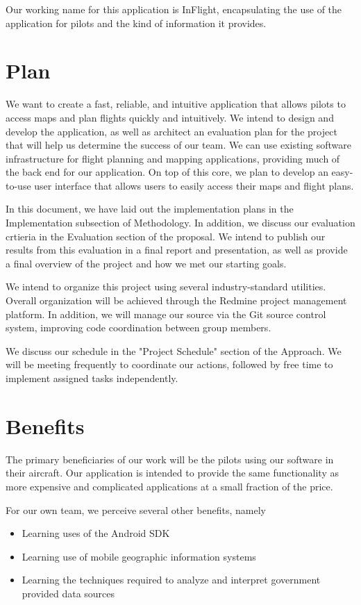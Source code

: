 \documentclass[10pt,a4paper]{report}
\begin{document}
Our working name for this application is InFlight, encapsulating the use of the application for pilots and the kind of information it provides.
\section{Plan}
We want to create a fast, reliable, and intuitive application that allows pilots to access maps and plan flights quickly and intuitively. We intend to design and develop the application, as well as architect an evaluation plan for the project that will help us determine the success of our team. We can use existing software infrastructure for flight planning and mapping applications, providing much of the back end for our application. On top of this core, we plan to develop an easy-to-use user interface that allows users to easily access their maps and flight plans. 

In this document, we have laid out the implementation plans in the Implementation subsection of Methodology. In addition, we discuss our evaluation crtieria in the Evaluation section of the proposal. We intend to publish our results from this evaluation in a final report and presentation, as well as provide a final overview of the project and how we met our starting goals.

We intend to organize this project using several industry-standard utilities. Overall organization will be achieved through the Redmine project management platform. In addition, we will manage our source via the Git source control system, improving code coordination between group members. 

We discuss our schedule in the "Project Schedule" section of the Approach. We will be meeting frequently to coordinate our actions, followed by free time to implement assigned tasks independently.
\section{Benefits}
The primary beneficiaries of our work will be the pilots using our software in their aircraft. Our application is intended to provide the same functionality as more expensive and complicated applications at a small fraction of the price.

For our own team, we perceive several other benefits, namely
\begin{itemize}
\item Learning uses of the Android SDK
\item Learning use of mobile geographic information systems
\item Learning the techniques required to analyze and interpret government provided data sources
\end{itemize}
\end{document}

